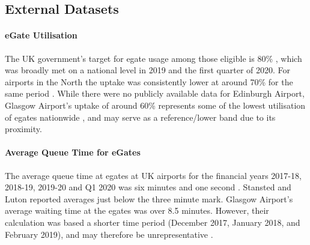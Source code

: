 \documentclass[10pt]{article}
\begin{document}
\subsection{External Datasets} \label{sec:observed_arrivals_data}

\paragraph{eGate Utilisation}
The UK government's target for \gls{egate} usage among those eligible is 80\% \cite{UK_border_2025}, which was broadly met on a national level in 2019 and the first quarter of 2020. For airports in the North the uptake was consistently lower at around 70\% for the same period \cite{Inspection_eGates}. While there were no publicly available data for Edinburgh Airport, Glasgow Airport's uptake of around 60\% represents some of the lowest utilisation of \glspl{egate} nationwide \cite{Inspection_eGates}, and may serve as a reference/lower band due to its proximity.

\paragraph{Average Queue Time for eGates}
The average queue time at \glspl{egate} at UK airports for the financial years 2017-18, 2018-19, 2019-20 and Q1 2020 was six minutes and one second \cite{Inspection_eGates}. Stansted and Luton reported averages just below the three minute mark. Glasgow Airport's average waiting time at the \glspl{egate} was over 8.5 minutes. However, their calculation was based a shorter time period (December 2017, January 2018, and February 2019), and may therefore be unrepresentative \cite{Inspection_eGates}.
\end{document}

